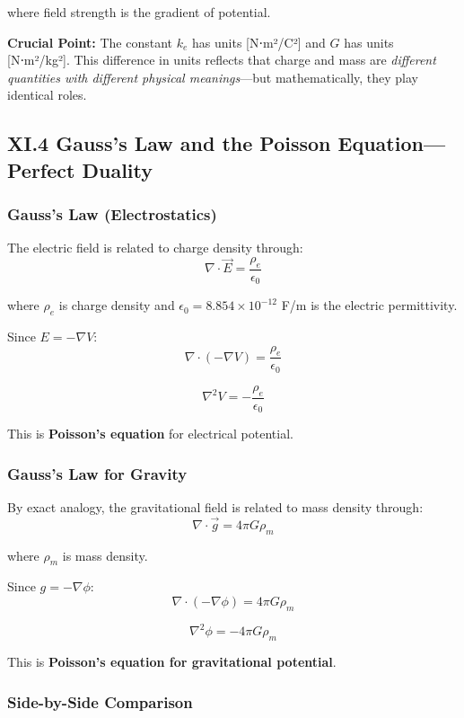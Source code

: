\documentclass[
]{article}
\begin{document}
where field strength is the gradient of potential.

\textbf{Crucial Point:} The constant \(k_e\) has units {[}N⋅m²/C²{]} and
\(G\) has units {[}N⋅m²/kg²{]}. This difference in units reflects that
charge and mass are \emph{different quantities with different physical
meanings}---but mathematically, they play identical roles.

\subsection{XI.4 Gauss's Law and the Poisson Equation---Perfect
Duality}\label{xi.4-gausss-law-and-the-poisson-equationperfect-duality}

\subsubsection{Gauss's Law
(Electrostatics)}\label{gausss-law-electrostatics}

The electric field is related to charge density through:
\[\nabla \cdot \vec{E} = \frac{\rho_e}{\epsilon_0}\]

where \(\rho_e\) is charge density and
\(\epsilon_0 = 8.854 \times 10^{-12}\) F/m is the electric permittivity.

Since \(E = -\nabla V\):
\[\nabla \cdot (-\nabla V) = \frac{\rho_e}{\epsilon_0}\]

\[\nabla^2 V = -\frac{\rho_e}{\epsilon_0}\]

This is \textbf{Poisson's equation} for electrical potential.

\subsubsection{Gauss's Law for Gravity}\label{gausss-law-for-gravity}

By exact analogy, the gravitational field is related to mass density
through: \[\nabla \cdot \vec{g} = 4\pi G \rho_m\]

where \(\rho_m\) is mass density.

Since \(g = -\nabla \phi\):
\[\nabla \cdot (-\nabla \phi) = 4\pi G \rho_m\]

\[\nabla^2 \phi = -4\pi G \rho_m\]

This is \textbf{Poisson's equation for gravitational potential}.

\subsubsection{Side-by-Side Comparison}\label{side-by-side-comparison}
\end{document}
